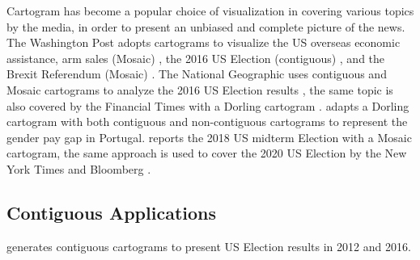 Cartogram has become a popular choice of visualization in covering various topics by the media, in order to present an unbiased and complete picture of the news. The Washington Post adopts cartograms to visualize the US overseas economic assistance, arm sales (Mosaic) \cite{bearak2016Everything}, the 2016 US Election (contiguous) \cite{gamio2016Election}, and the Brexit Referendum (Mosaic) \cite{taylor2016What}. The National Geographic uses contiguous and Mosaic cartograms to analyze the 2016 US Election results \cite{miller2016Election}, the same topic is also covered by the Financial Times with a Dorling cartogram \cite{stabe2016Search}. \cite{cruz2017Adapted} adapts a Dorling cartogram with both contiguous and non-contiguous cartograms to represent the gender pay gap in Portugal.  reports the 2018 US midterm Election with a Mosaic cartogram, the same approach is used to cover the 2020 US Election by the New York Times \cite{thelearningnetwork2020What} and Bloomberg \cite{mccartney20202020}.

\subsection{Contiguous Applications}

 generates contiguous cartograms to present US Election results in 2012 and 2016. 

